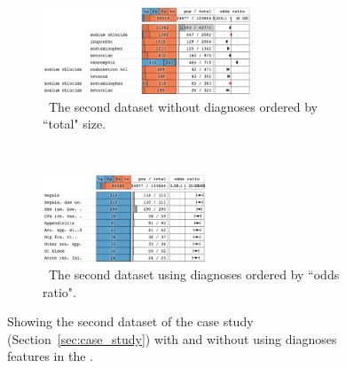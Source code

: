 \begin{figure}
\centering
\begin{subfigure}[b]{0.75\linewidth}
    \hfill
    \includegraphics[height=7em]{explainer/adm_10_size}
    \caption{~The second dataset without diagnoses ordered by ``total" size.}
    \label{figs:adm_10_size}
\end{subfigure}
\\
\begin{subfigure}[b]{0.75\linewidth}
    \hfill
    \includegraphics[height=7em]{explainer/adm_10_or_full}
    \caption{~The second dataset using diagnoses ordered by ``odds ratio".}
    \label{figs:adm_10_diag}
\end{subfigure}%
\caption[Showing the second dataset of the case study.]{Showing the second dataset of the case study (Section~\ref{sec:case_study}) with and without using diagnoses features in the \textbf{\tabB}.}
\end{figure}
